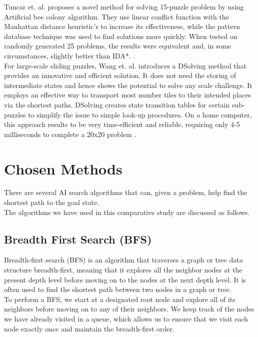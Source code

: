 \documentclass[12pt]{article}
\begin{document}
Tuncar et. al. proposes a novel method for solving 15-puzzle problem by using Artificial bee colony algorithm. They use linear conflict function with the Manhattan distance heuristic's to increase its effectiveness, while the pattern database technique was used to find solutions more quickly. When tested on randomly generated 25 problems, the results were equivalent and, in some circumstances, slightly better than IDA*. \cite{b5}. \\

For large-scale sliding puzzles, Wang et. al. introduces a DSolving method that provides an innovative and efficient solution. It does not need the storing of intermediate states and hence shows the potential to solve any scale challenge. It employs an effective way to transport most number tiles to their intended places via the shortest paths. DSolving creates state transition tables for certain sub-puzzles to simplify the issue to simple look-up procedures. On a home computer, this approach results to be very time-efficient and reliable, requiring only 4-5 milliseconds to complete a 20x20 problem \cite{b6}.

\section{Chosen Methods}
There are several AI search algorithms that can, given a problem, help find the shortest path to the goal state. \\
The algorithms we have used in this comparative study are discussed as follows.

\subsection{Breadth First Search (BFS)}
Breadth-first search (BFS) is an algorithm that traverses a graph or tree data structure breadth-first, meaning that it explores all the neighbor nodes at the present depth level before moving on to the nodes at the next depth level. It is often used to find the shortest path between two nodes in a graph or tree. \\

To perform a BFS, we start at a designated root node and explore all of its neighbors before moving on to any of their neighbors. We keep track of the nodes we have already visited in a queue, which allows us to ensure that we visit each node exactly once and maintain the breadth-first order. \\
\end{document}
